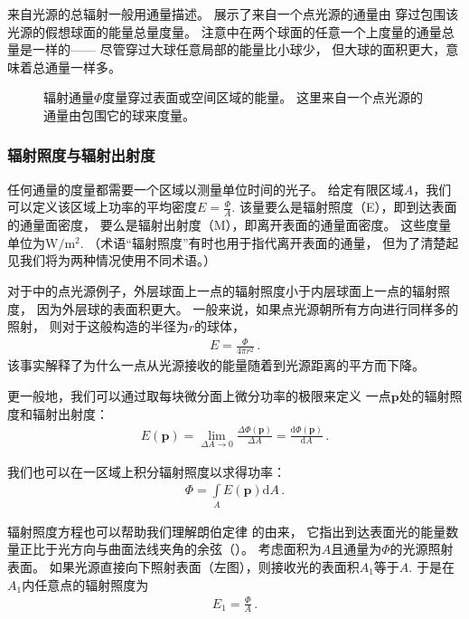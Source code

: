 来自光源的总辐射一般用通量描述。
展示了来自一个点光源的通量由
穿过包围该光源的假想球面的能量总量度量。
注意中在两个球面的任意一个上度量的通量总量是一样的——
尽管穿过大球任意局部的能量比小球少，
但大球的面积更大，意味着总通量一样多。
\begin{figure}[htbp]
    \centering
    \caption{辐射通量$\varPhi$度量穿过表面或空间区域的能量。
        这里来自一个点光源的通量由包围它的球来度量。}
    \label{fig:5.6}
\end{figure}

\subsubsection*{辐射照度与辐射出射度}
任何通量的度量都需要一个区域以测量单位时间的光子。
给定有限区域$A$，我们可以定义该区域上功率的平均密度$\displaystyle E=\frac{\varPhi}{A}$.
该量要么是{\sffamily 辐射照度}（E），即到达表面的通量面密度，
要么是{\sffamily 辐射出射度}（M），即离开表面的通量面密度。
这些度量单位为$\text{W}/\text{m}^2$.
（术语“辐射照度”有时也用于指代离开表面的通量，
但为了清楚起见我们将为两种情况使用不同术语。）

对于中的点光源例子，外层球面上一点的辐射照度小于内层球面上一点的辐射照度，
因为外层球的表面积更大。
一般来说，如果点光源朝所有方向进行同样多的照射，
则对于这般构造的半径为$r$的球体，
\begin{align*}
    E=\frac{\varPhi}{4\pi r^2}\, .
\end{align*}
该事实解释了为什么一点从光源接收的能量随着到光源距离的平方而下降。

更一般地，我们可以通过取每块微分面上微分功率的极限来定义
一点$\bm p$处的辐射照度和辐射出射度：
\begin{align*}
    E(\bm p)=\lim\limits_{\Delta A\rightarrow 0}{\frac{\Delta \varPhi(\bm p)}{\Delta A}}=\frac{\mathrm{d}\varPhi(\bm p)}{\mathrm{d}A}\, .
\end{align*}

我们也可以在一区域上积分辐射照度以求得功率：
\begin{align*}
    \varPhi=\int\limits_A E(\bm p)\mathrm{d}A\, .
\end{align*}

辐射照度方程也可以帮助我们理解{\sffamily 朗伯定律}
的由来，
它指出到达表面光的能量数量正比于光方向与曲面法线夹角的余弦（）。
考虑面积为$A$且通量为$\varPhi$的光源照射表面。
如果光源直接向下照射表面（左图），则接收光的表面积$A_1$等于$A$.
于是在$A_1$内任意点的辐射照度为
\begin{align*}
    E_1=\frac{\varPhi}{A}\, .
\end{align*}

